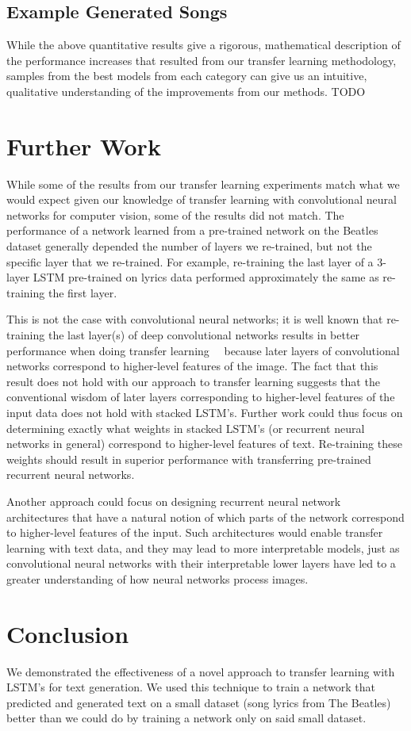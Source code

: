 \documentclass[10pt,twocolumn,letterpaper]{article}
\begin{document}
	\subsection{Example Generated Songs}
		While the above quantitative results give a rigorous, mathematical description of the performance increases that resulted from our transfer learning methodology, samples from the best models from each category can give us an intuitive, qualitative understanding of the improvements from our methods. TODO

\section{Further Work}
	While some of the results from our transfer learning experiments match what we would expect given our knowledge of transfer learning with convolutional neural networks for computer vision, some of the results did not match. The performance of a network learned from a pre-trained network on the Beatles dataset generally depended the number of layers we re-trained, but not the specific layer that we re-trained. For example, re-training the last layer of a 3-layer LSTM pre-trained on lyrics data performed approximately the same as re-training the first layer.
	
	This is not the case with convolutional neural networks; it is well known that re-training the last layer(s) of deep convolutional networks results in better performance when doing transfer learning~\cite{CNNOffTheShelf}~\cite{TransferableFeaturesNN} because later layers of convolutional networks correspond to higher-level features of the image. The fact that this result does not hold with our approach to transfer learning suggests that the conventional wisdom of later layers corresponding to higher-level features of the input data does not hold with stacked LSTM's. Further work could thus focus on determining exactly what weights in stacked LSTM's (or recurrent neural networks in general) correspond to higher-level features of text. Re-training these weights should result in superior performance with transferring pre-trained recurrent neural networks.
	
	Another approach could focus on designing recurrent neural network architectures that have a natural notion of which parts of the network correspond to higher-level features of the input. Such architectures would enable transfer learning with text data, and they may lead to more interpretable models, just as convolutional neural networks with their interpretable lower layers have led to a greater understanding of how neural networks process images.

\section{Conclusion}
	We demonstrated the effectiveness of a novel approach to transfer learning with LSTM's for text generation. We used this technique to train a network that predicted and generated text on a small dataset (song lyrics from The Beatles) better than we could do by training a network only on said small dataset.

{\small


}
\end{document}
